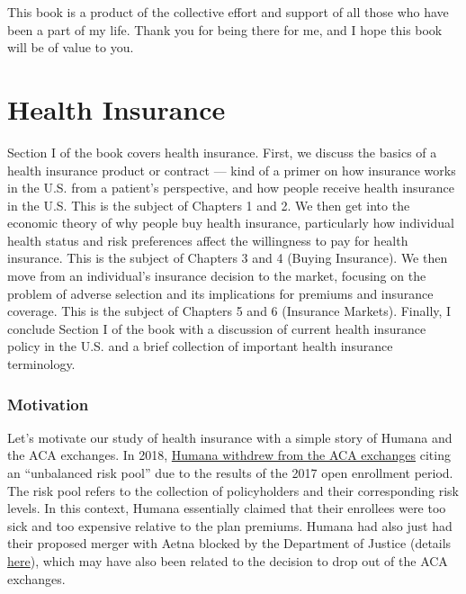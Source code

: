 \documentclass[
  letterpaper,
  DIV=11,
  numbers=noendperiod]{scrreport}
\theoremstyle{definition}
\theoremstyle{remark}
\begin{document}
This book is a product of the collective effort and support of all those
who have been a part of my life. Thank you for being there for me, and I
hope this book will be of value to you.

\part{Health Insurance}

Section I of the book covers health insurance. First, we discuss the
basics of a health insurance product or contract --- kind of a primer on
how insurance works in the U.S. from a patient's perspective, and how
people receive health insurance in the U.S. This is the subject of
Chapters 1 and 2. We then get into the economic theory of why people buy
health insurance, particularly how individual health status and risk
preferences affect the willingness to pay for health insurance. This is
the subject of Chapters 3 and 4 (Buying Insurance). We then move from an
individual's insurance decision to the market, focusing on the problem
of adverse selection and its implications for premiums and insurance
coverage. This is the subject of Chapters 5 and 6 (Insurance Markets).
Finally, I conclude Section I of the book with a discussion of current
health insurance policy in the U.S. and a brief collection of important
health insurance terminology.

\hypertarget{motivation}{%
\section*{Motivation}\label{motivation}}


Let's motivate our study of health insurance with a simple story of
Humana and the ACA exchanges. In 2018,
\href{https://money.cnn.com/2017/02/14/news/economy/humana-obamacare-insurer}{Humana
withdrew from the ACA exchanges} citing an ``unbalanced risk pool'' due
to the results of the 2017 open enrollment period. The risk pool refers
to the collection of policyholders and their corresponding risk levels.
In this context, Humana essentially claimed that their enrollees were
too sick and too expensive relative to the plan premiums. Humana had
also just had their proposed merger with Aetna blocked by the Department
of Justice (details
\href{https://www.npr.org/sections/thetwo-way/2017/02/14/515167491/aetna-and-humana-call-off-merger-after-court-decision}{here}),
which may have also been related to the decision to drop out of the ACA
exchanges.
\end{document}
